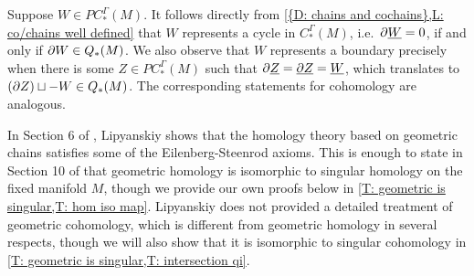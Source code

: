 \begin{comment}
	\red{Reflecting on all of these definitions, an illustrative example of a manifold over $M$ defined by a proper map
		is given by embedding the positive $x$-axis within $\R^3 \setminus \{0\}$, \red{together with a choice of orientation of its normal bundle}, which represents a generator of the second cohomology [GBF: I modified this example to make it clearer that we index by codimension, since none of the previous examples really showed that off.]}.
	Another illustrative example is given by a linear embedding of $\R P^2$ into $\R P^4$.
	The domain manifold is not orientable, but the map is co-orientable and represents a nonzero class in $H^2(\R P^4; \Z)$.
	\red{[GBF: How do we know this class is non-zero? Can we prove that?]}
	We also recall that Schubert subvarieties of Grassmannians are not smooth, but do have standard
	smooth resolutions with reference maps to Grassmannians which can used to represent cohomology.
\end{comment}

\begin{comment}
	In Section 6 of \cite{Lipy14}, Lipyanskiy shows that the homology of $C_\Gamma^*(M)$, which we denote by $H_\Gamma^*(M)$,
	agrees with singular cohomology
	through the verification of homotopy and excision axioms.
	We find Mayer--Vietoris better for our applications, and we review both its verification
	and that of homotopy invariance as we need details about such constructions in our work.
\end{comment}

\begin{remark}\label{R: cycles and boundaries}
	Suppose $W \in PC_*^{\Gamma}(M)$.
	It follows directly from \cref{{D: chains and cochains},L: co/chains well defined} that $W$ represents a cycle in $C_*^{\Gamma}(M)$, i.e.\ $\partial \underline{W}=0$, if and only if $\partial W \in Q_*(M)$.
	We also observe that $W$ represents a boundary precisely when there is some $Z \in PC_*^\Gamma(M)$ such that $\partial \underline{Z} = \underline{\partial Z} = \underline{W}$, which translates to $(\partial Z) \sqcup -W \in Q_*(M)$.
	The corresponding statements for cohomology are analogous.
\end{remark}

In Section 6 of \cite{Lipy14}, Lipyanskiy shows that the homology theory based on geometric chains satisfies some of the Eilenberg-Steenrod axioms.
This is enough to state in Section 10 of \cite{Lipy14} that geometric homology is isomorphic to singular homology on the fixed manifold $M$, though we provide our own proofs below in \cref{T: geometric is singular,T: hom iso map}.
Lipyanskiy does not provided a detailed treatment of geometric cohomology, which is different from geometric homology in several respects, though we will also show that it is isomorphic to singular cohomology in \cref{T: geometric is singular,T: intersection qi}.

